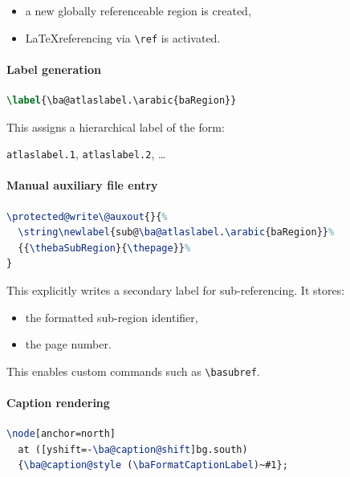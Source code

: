 \begin{itemize}
\item a new globally referenceable region is created,
\item \LaTeX referencing via \lstinline|\ref| is activated.
\end{itemize}



\paragraph{Label generation}

\begin{lstlisting}[language=LaTeX]
\label{\ba@atlaslabel.\arabic{baRegion}}
\end{lstlisting}

This assigns a hierarchical label of the form:

\begin{center}
\texttt{atlaslabel.1}, \texttt{atlaslabel.2}, \dots
\end{center}



\paragraph{Manual auxiliary file entry}

\begin{lstlisting}[language=LaTeX]
\protected@write\@auxout{}{%
  \string\newlabel{sub@\ba@atlaslabel.\arabic{baRegion}}%
  {{\thebaSubRegion}{\thepage}}%
}
\end{lstlisting}

This explicitly writes a secondary label for sub-referencing. It stores:

\begin{itemize}
\item the formatted sub-region identifier,
\item the page number.
\end{itemize}

This enables custom commands such as \lstinline|\basubref|.



\paragraph{Caption rendering}

\begin{lstlisting}[language=LaTeX]
\node[anchor=north]
  at ([yshift=-\ba@caption@shift]bg.south)
  {\ba@caption@style (\baFormatCaptionLabel)~#1};
\end{lstlisting}

